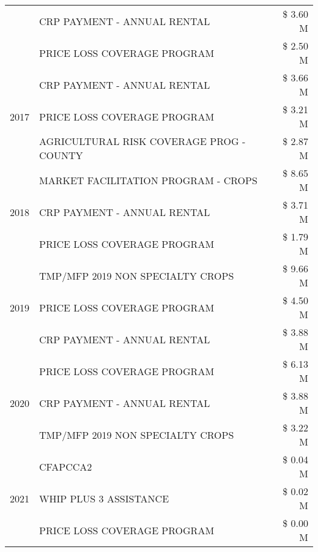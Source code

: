 \begin{tabular}{llr}
 & CRP PAYMENT - ANNUAL RENTAL & \$ 3.60 M \\
 & PRICE LOSS COVERAGE PROGRAM & \$ 2.50 M \\
\cline{1-3}
\multirow[t]{3}{*}{2017} & CRP PAYMENT - ANNUAL RENTAL & \$ 3.66 M \\
 & PRICE LOSS COVERAGE PROGRAM & \$ 3.21 M \\
 & AGRICULTURAL RISK COVERAGE PROG - COUNTY & \$ 2.87 M \\
\cline{1-3}
\multirow[t]{3}{*}{2018} & MARKET FACILITATION PROGRAM - CROPS & \$ 8.65 M \\
 & CRP PAYMENT - ANNUAL RENTAL & \$ 3.71 M \\
 & PRICE LOSS COVERAGE PROGRAM & \$ 1.79 M \\
\cline{1-3}
\multirow[t]{3}{*}{2019} & TMP/MFP 2019 NON SPECIALTY CROPS & \$ 9.66 M \\
 & PRICE LOSS COVERAGE PROGRAM & \$ 4.50 M \\
 & CRP PAYMENT - ANNUAL RENTAL & \$ 3.88 M \\
\cline{1-3}
\multirow[t]{3}{*}{2020} & PRICE LOSS COVERAGE PROGRAM & \$ 6.13 M \\
 & CRP PAYMENT - ANNUAL RENTAL & \$ 3.88 M \\
 & TMP/MFP 2019 NON SPECIALTY CROPS & \$ 3.22 M \\
\cline{1-3}
\multirow[t]{3}{*}{2021} & CFAPCCA2 & \$ 0.04 M \\
 & WHIP PLUS 3 ASSISTANCE & \$ 0.02 M \\
 & PRICE LOSS COVERAGE PROGRAM & \$ 0.00 M \\
\cline{1-3}
\bottomrule
\end{tabular}
